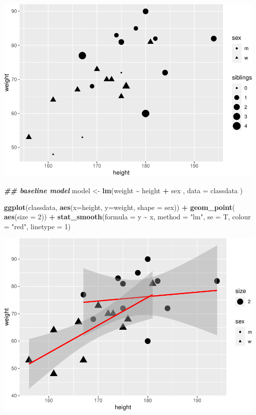 \documentclass[
  doc]{apa6}
\newenvironment{Shaded}{\begin{snugshade}}{\end{snugshade}}
\newcommand{\AttributeTok}[1]{\textcolor[rgb]{0.13,0.29,0.53}{#1}}
\newcommand{\DecValTok}[1]{\textcolor[rgb]{0.00,0.00,0.81}{#1}}
\newcommand{\DocumentationTok}[1]{\textcolor[rgb]{0.56,0.35,0.01}{\textbf{\textit{#1}}}}
\newcommand{\FunctionTok}[1]{\textcolor[rgb]{0.13,0.29,0.53}{\textbf{#1}}}
\newcommand{\NormalTok}[1]{#1}
\newcommand{\OtherTok}[1]{\textcolor[rgb]{0.56,0.35,0.01}{#1}}
\newcommand{\SpecialCharTok}[1]{\textcolor[rgb]{0.81,0.36,0.00}{\textbf{#1}}}
\newcommand{\StringTok}[1]{\textcolor[rgb]{0.31,0.60,0.02}{#1}}
\begin{document}
\includegraphics{rmd_reg_files/figure-latex/unnamed-chunk-14-1.pdf}

\begin{Shaded}
\begin{Highlighting}[]
\DocumentationTok{\#\# baseline model}
\NormalTok{model  }\OtherTok{\textless{}{-}} \FunctionTok{lm}\NormalTok{(weight }\SpecialCharTok{\textasciitilde{}}\NormalTok{ height }\SpecialCharTok{+}\NormalTok{ sex , }\AttributeTok{data =}\NormalTok{ classdata )}

\FunctionTok{ggplot}\NormalTok{(classdata, }\FunctionTok{aes}\NormalTok{(}\AttributeTok{x=}\NormalTok{height, }\AttributeTok{y=}\NormalTok{weight, }\AttributeTok{shape =}\NormalTok{ sex)) }\SpecialCharTok{+}
  \FunctionTok{geom\_point}\NormalTok{( }\FunctionTok{aes}\NormalTok{(}\AttributeTok{size =} \DecValTok{2}\NormalTok{)) }\SpecialCharTok{+}
  \FunctionTok{stat\_smooth}\NormalTok{(}\AttributeTok{formula =}\NormalTok{ y }\SpecialCharTok{\textasciitilde{}}\NormalTok{ x,  }
              \AttributeTok{method =} \StringTok{"lm"}\NormalTok{, }
              \AttributeTok{se =}\NormalTok{ T, }
              \AttributeTok{colour =} \StringTok{"red"}\NormalTok{, }
              \AttributeTok{linetype =} \DecValTok{1}\NormalTok{)}
\end{Highlighting}
\end{Shaded}

\includegraphics{rmd_reg_files/figure-latex/unnamed-chunk-15-1.pdf}
\end{document}

